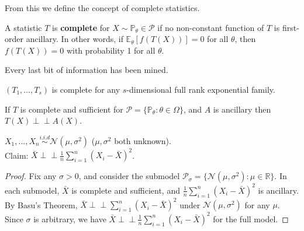 From this we define the concept of complete statistics.

\begin{defn}
A statistic $T$ is \textbf{complete} for $X \sim \mathbb{P}_\theta \in \mathcal{P}$ if no non-constant function of $T$ is first-order ancillary. In other words, if $\mathbb{E}_\theta[f(T(X))] = 0$ for all $\theta$, then $f(T(X)) = 0$ with probability 1 for all $\theta$.
\end{defn}
\begin{rem}
    Every last bit of information has been mined.
\end{rem}

\begin{thm}
$(T_1, \ldots, T_s)$ is complete for any $s$-dimensional full rank exponential family.
\end{thm}

\begin{thm}
If $T$ is complete and sufficient for $\mathcal{P} = \{\mathbb{P}_\theta : \theta \in \Omega\}$, and $A$ is ancillary then $T(X) \perp\!\!\!\perp A(X)$.
\end{thm}

\begin{exam}
$X_1, \ldots, X_n \stackrel{i.i.d}{\sim} \mathcal{N}(\mu, \sigma^2)$ ($\mu, \sigma^2$ both unknown). \\
Claim: $\bar{X} \perp\!\!\!\perp \frac{1}{n} \sum_{i=1}^{n} (X_i - \bar{X})^2$.
\end{exam}

\begin{proof}
Fix any $\sigma > 0$, and consider the submodel $\mathcal{P}_\sigma = \{\mathcal{N}(\mu, \sigma^2) : \mu \in \mathbb{R}\}$. In each submodel, $\bar{X}$ is complete and sufficient, and $\frac{1}{n} \sum_{i=1}^{n} (X_i - \bar{X})^2$ is ancillary. By Basu's Theorem, $\bar{X} \perp\!\!\!\perp \sum_{i=1}^{n} (X_i - \bar{X})^2$ under $\mathcal{N}(\mu, \sigma^2)$ for any $\mu$. Since $\sigma$ is arbitrary, we have $\bar{X} \perp\!\!\!\perp \frac{1}{n} \sum_{i=1}^{n} (X_i - \bar{X})^2$ for the full model.
\end{proof}

